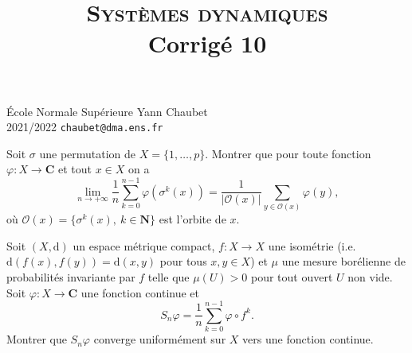 \documentclass[a4paper,10pt,openany]{article}
\title{\textsc{Syst\`emes dynamiques} \\  Corrig\'e 10}
\date{}
\author{}
\theoremstyle{plain}
\theoremstyle{definition}
\newcommand{\dd}{\mathrm{d}}
\newcommand{\N}{\mathbf{N}}
\newcommand{\C}{\mathbf{C}}
\begin{document}
{\noindent \'Ecole Normale Sup\'erieure  \hfill Yann Chaubet } \\
{2021/2022 \hfill  \texttt{chaubet@dma.ens.fr}}

{\let\newpage\relax\maketitle}
\maketitle
 
 
\vspace{1cm}
 \vspace{1.5mm} 

\noindent Soit $\sigma$ une permutation de $X = \{1, \dots, p\}$. Montrer que pour toute fonction $\varphi : X \to \C$ et tout $x \in X$ on a
$$
\lim_{n \to +\infty} \frac{1}{n} \sum_{k=0}^{n-1} \varphi\left(\sigma^k(x)\right) = \frac{1}{\left|\mathcal{O}(x)\right|} \sum_{y \in \mathcal{O}(x)}  \varphi(y),
$$
o\`u $\mathcal{O}(x) = \{\sigma^k(x),~k \in \N\}$ est l'orbite de $x$.
\vspace{0.6cm}

 \vspace{1.5mm} 

\noindent Soit $(X, \dd)$ un espace m\'etrique compact, $f : X \to X$ une isom\'etrie (i.e. $\dd(f(x), f(y)) = \dd(x,y)$ pour tous $x,y \in X$) et $\mu$ une mesure bor\'elienne de probabilit\'es invariante par $f$ telle que $\mu(U) > 0$ pour tout ouvert $U$ non vide. Soit $\varphi : X \to \C$ une fonction continue et 
$$
S_n \varphi = \frac{1}{n}  \sum_{k=0}^{n-1} \varphi \circ f^k.
$$ 
Montrer que $S_n\varphi$
converge uniform\'ement sur $X$ vers une fonction continue.
\iffalse
\begin{enumerate}
\item Montrer que pour tout $\delta > 0$, il existe $J \in \N$ et $x_1, \dots, x_J \in X$ tels que $\displaystyle{X = \bigcup_{j = 1}^J B(x_j, \delta)}$ et pour tout $j = 1, \dots J$, la suite
$
S_n \varphi (x_j) 
$
converge quand $n \to +\infty$.
\item Montrer que $S_n\varphi$
converge uniform\'ement sur $X$ vers une fonction continue.
\end{enumerate}
\fi

\vspace{0.6cm}
\end{document}
